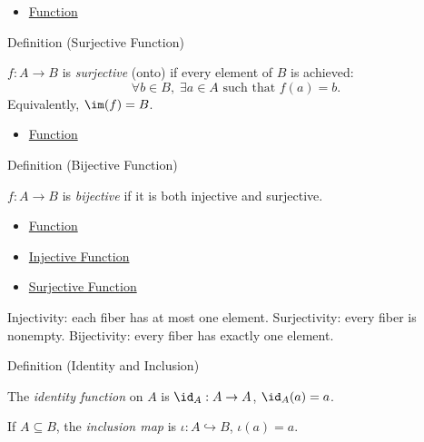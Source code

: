 \begin{dependencies}
\begin{itemize}
  \item \hyperref[def:function]{Function}
\end{itemize}
\end{dependencies}

\begin{definitionbox}{Definition (Surjective Function)}
\begin{definition}\label{def:surjective}
$f : A \to B$ is \emph{surjective} (onto) if every element of $B$ is achieved:
\[
\forall b \in B,\; \exists a \in A \text{ such that } f(a)=b.
\]
Equivalently, $\im(f) = B$.
\end{definition}
\end{definitionbox}

\begin{dependencies}
\begin{itemize}
  \item \hyperref[def:function]{Function}
\end{itemize}
\end{dependencies}

\begin{definitionbox}{Definition (Bijective Function)}
\begin{definition}\label{def:bijective}
$f : A \to B$ is \emph{bijective} if it is both injective and surjective.
\end{definition}
\end{definitionbox}

\begin{dependencies}
\begin{itemize}
  \item \hyperref[def:function]{Function}
  \item \hyperref[def:injective]{Injective Function}
  \item \hyperref[def:surjective]{Surjective Function}
\end{itemize}
\end{dependencies}

\begin{remark*}
Injectivity: each fiber has at most one element. Surjectivity: every fiber is
nonempty. Bijectivity: every fiber has exactly one element.
\end{remark*}

\begin{definitionbox}{Definition (Identity and Inclusion)}
\begin{definition}\label{def:identity}
The \emph{identity function} on $A$ is $\id_A : A \to A$, $\id_A(a) = a$.

If $A \subseteq B$, the \emph{inclusion map} is $\iota : A \hookrightarrow B$,
$\iota(a) = a$.
\end{definition}
\end{definitionbox}

